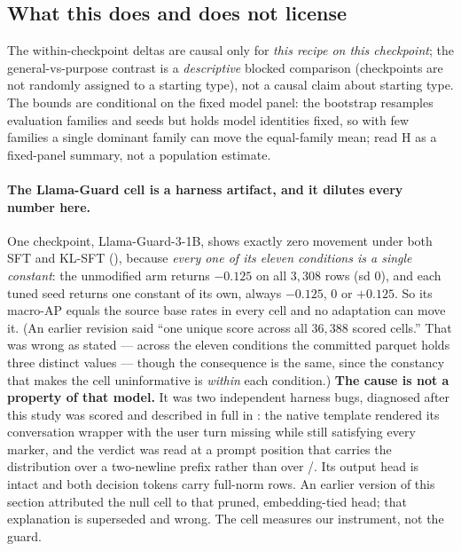 \subsection{What this does and does not license}
\label{sec:adaptation-license}
\noindent
The within-checkpoint deltas are causal only for \emph{this recipe on this checkpoint}; the
general-vs-purpose contrast is a \emph{descriptive} blocked comparison (checkpoints are not randomly
assigned to a starting type), not a causal claim about starting type. The bounds are conditional on the
fixed model panel: the bootstrap resamples evaluation families and seeds but holds model identities
fixed, so with few families a single dominant family can move the equal-family mean; read H as a
fixed-panel summary, not a population estimate.

\paragraph{The Llama-Guard cell is a harness artifact, and it dilutes every number here.}
One checkpoint, Llama-Guard-3-1B, shows exactly zero movement under both SFT and KL-SFT
(), because \emph{every one of its eleven conditions is a single constant}: the
unmodified arm returns $-0.125$ on all $3{,}308$ rows (sd $0$), and each tuned seed returns one
constant of its own, always $-0.125$, $0$ or $+0.125$. So its macro-AP equals the source base rates in
every cell and no adaptation can move it. (An earlier revision said ``one unique score across all
$36{,}388$ scored cells.'' That was wrong as stated --- across the eleven conditions the committed
parquet holds three distinct values --- though the consequence is the same, since the constancy that
makes the cell uninformative is \emph{within} each condition.) \textbf{The cause is not a
property of that model.} It was two independent harness bugs, diagnosed after this study was scored
and described in full in : the native template rendered its conversation
wrapper with the user turn missing while still satisfying every marker, and the verdict was read at a
prompt position that carries the distribution over a two-newline prefix rather than over
/. Its output head is intact and both decision tokens carry full-norm rows. An
earlier version of this section attributed the null cell to that pruned, embedding-tied head; that
explanation is superseded and wrong. The cell measures our instrument, not the guard.

